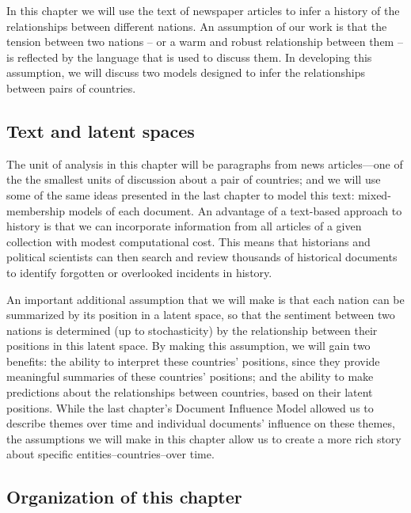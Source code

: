 In this chapter we will use the text of newspaper articles to infer a
history of the relationships between different nations.  An assumption
of our work is that the tension between two nations -- or a warm and
robust relationship between them -- is reflected by the language that
is used to discuss them.  In developing this assumption, we will
discuss two models designed to infer the relationships between pairs
of countries.

\subsection*{Text and latent spaces}
The unit of analysis in this chapter will be paragraphs from news
articles---one of the the smallest units of discussion about a pair of
countries; and we will use some of the same ideas presented in the
last chapter to model this text: mixed-membership models of each
document.  An advantage of a text-based approach to history is that we
can incorporate information from all articles of a given collection
with modest computational cost.  This means that historians and
political scientists can then search and review thousands of
historical documents to identify forgotten or overlooked incidents in
history.

An important additional assumption that we will make is that each
nation can be summarized by its position in a latent space, so that
the sentiment between two nations is determined (up to stochasticity)
by the relationship between their positions in this latent space.  By
making this assumption, we will gain two benefits: the ability to
interpret these countries' positions, since they provide meaningful
summaries of these countries' positions; and the ability to make
predictions about the relationships between countries, based on their
latent positions. While the last chapter's Document Influence Model
allowed us to describe themes over time and individual documents'
influence on these themes, the assumptions we will make in this
chapter allow us to create a more rich story about specific
entities--countries--over time.



\subsection*{Organization of this chapter}

